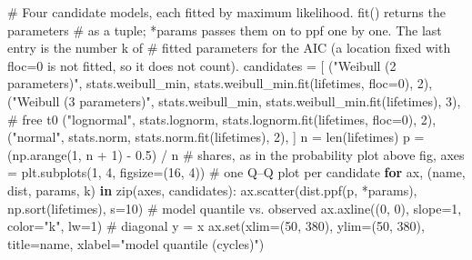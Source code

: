 \documentclass[
  letterpaper,
  DIV=11,
  numbers=noendperiod]{scrreprt}
\newenvironment{Shaded}{\begin{snugshade}}{\end{snugshade}}
\newcommand{\BuiltInTok}[1]{\textcolor[rgb]{0.00,0.23,0.31}{#1}}
\newcommand{\CommentTok}[1]{\textcolor[rgb]{0.37,0.37,0.37}{#1}}
\newcommand{\ControlFlowTok}[1]{\textcolor[rgb]{0.00,0.23,0.31}{\textbf{#1}}}
\newcommand{\DecValTok}[1]{\textcolor[rgb]{0.68,0.00,0.00}{#1}}
\newcommand{\FloatTok}[1]{\textcolor[rgb]{0.68,0.00,0.00}{#1}}
\newcommand{\KeywordTok}[1]{\textcolor[rgb]{0.00,0.23,0.31}{\textbf{#1}}}
\newcommand{\NormalTok}[1]{\textcolor[rgb]{0.00,0.23,0.31}{#1}}
\newcommand{\OperatorTok}[1]{\textcolor[rgb]{0.37,0.37,0.37}{#1}}
\newcommand{\StringTok}[1]{\textcolor[rgb]{0.13,0.47,0.30}{#1}}
\begin{document}
\begin{Shaded}
\begin{Highlighting}[]
\CommentTok{\# Four candidate models, each fitted by maximum likelihood. fit() returns the parameters}
\CommentTok{\# as a tuple; *params passes them on to ppf one by one. The last entry is the number k of}
\CommentTok{\# fitted parameters for the AIC (a location fixed with floc=0 is not fitted, so it does not count).}
\NormalTok{candidates }\OperatorTok{=}\NormalTok{ [}
\NormalTok{    (}\StringTok{"Weibull (2 parameters)"}\NormalTok{, stats.weibull\_min, stats.weibull\_min.fit(lifetimes, floc}\OperatorTok{=}\DecValTok{0}\NormalTok{), }\DecValTok{2}\NormalTok{),}
\NormalTok{    (}\StringTok{"Weibull (3 parameters)"}\NormalTok{, stats.weibull\_min, stats.weibull\_min.fit(lifetimes), }\DecValTok{3}\NormalTok{),  }\CommentTok{\# free t0}
\NormalTok{    (}\StringTok{"lognormal"}\NormalTok{, stats.lognorm, stats.lognorm.fit(lifetimes, floc}\OperatorTok{=}\DecValTok{0}\NormalTok{), }\DecValTok{2}\NormalTok{),}
\NormalTok{    (}\StringTok{"normal"}\NormalTok{, stats.norm, stats.norm.fit(lifetimes), }\DecValTok{2}\NormalTok{),}
\NormalTok{]}
\NormalTok{n }\OperatorTok{=} \BuiltInTok{len}\NormalTok{(lifetimes)}
\NormalTok{p }\OperatorTok{=}\NormalTok{ (np.arange(}\DecValTok{1}\NormalTok{, n }\OperatorTok{+} \DecValTok{1}\NormalTok{) }\OperatorTok{{-}} \FloatTok{0.5}\NormalTok{) }\OperatorTok{/}\NormalTok{ n                     }\CommentTok{\# shares, as in the probability plot above}
\NormalTok{fig, axes }\OperatorTok{=}\NormalTok{ plt.subplots(}\DecValTok{1}\NormalTok{, }\DecValTok{4}\NormalTok{, figsize}\OperatorTok{=}\NormalTok{(}\DecValTok{16}\NormalTok{, }\DecValTok{4}\NormalTok{))         }\CommentTok{\# one Q–Q plot per candidate}
\ControlFlowTok{for}\NormalTok{ ax, (name, dist, params, k) }\KeywordTok{in} \BuiltInTok{zip}\NormalTok{(axes, candidates):}
\NormalTok{    ax.scatter(dist.ppf(p, }\OperatorTok{*}\NormalTok{params), np.sort(lifetimes), s}\OperatorTok{=}\DecValTok{10}\NormalTok{)   }\CommentTok{\# model quantile vs. observed}
\NormalTok{    ax.axline((}\DecValTok{0}\NormalTok{, }\DecValTok{0}\NormalTok{), slope}\OperatorTok{=}\DecValTok{1}\NormalTok{, color}\OperatorTok{=}\StringTok{"k"}\NormalTok{, lw}\OperatorTok{=}\DecValTok{1}\NormalTok{)                 }\CommentTok{\# diagonal y = x}
\NormalTok{    ax.}\BuiltInTok{set}\NormalTok{(xlim}\OperatorTok{=}\NormalTok{(}\DecValTok{50}\NormalTok{, }\DecValTok{380}\NormalTok{), ylim}\OperatorTok{=}\NormalTok{(}\DecValTok{50}\NormalTok{, }\DecValTok{380}\NormalTok{), title}\OperatorTok{=}\NormalTok{name, xlabel}\OperatorTok{=}\StringTok{"model quantile (cycles)"}\NormalTok{)}

\end{Highlighting}
\end{Shaded}
\end{document}
